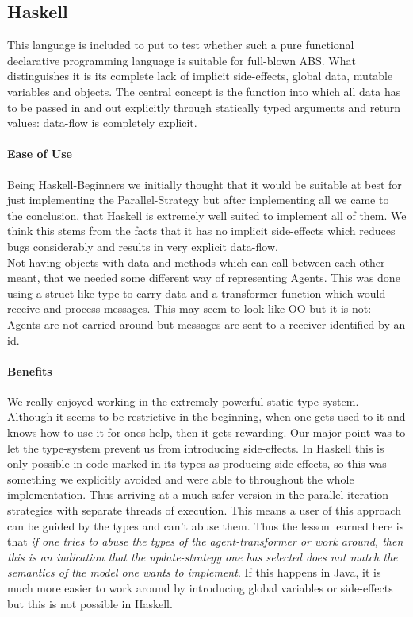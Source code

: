  
\subsection{Haskell}
This language is included to put to test whether such a pure functional declarative programming language is suitable for full-blown ABS. What distinguishes it is its complete lack of implicit side-effects, global data, mutable variables and objects. The central concept is the function into which all data has to be passed in and out explicitly through statically typed arguments and return values: data-flow is completely explicit.

\paragraph{Ease of Use}
Being Haskell-Beginners we initially thought that it would be suitable at best for just implementing the Parallel-Strategy but after implementing all we came to the conclusion, that Haskell is extremely well suited to implement all of them. We think this stems from the facts that it has no implicit side-effects which reduces bugs considerably and results in very explicit data-flow. \\

Not having objects with data and methods which can call between each other meant, that we needed some different way of representing Agents. This was done using a struct-like type to carry data and a transformer function which would receive and process messages. This may seem to look like OO but it is not: Agents are not carried around but messages are sent to a receiver identified by an id.

\paragraph{Benefits}
We really enjoyed working in the extremely powerful static type-system. Although it seems to be restrictive in the beginning, when one gets used to it and knows how to use it for ones help, then it gets rewarding. Our major point was to let the type-system prevent us from introducing side-effects. In Haskell this is only possible in code marked in its types as producing side-effects, so this was something we explicitly avoided and were able to throughout the whole implementation. Thus arriving at a much safer version in the parallel iteration-strategies with separate threads of execution. This means a user of this approach can be guided by the types and can't abuse them. Thus the lesson learned here is that \textit{if one tries to abuse the types of the agent-transformer or work around, then this is an indication that the update-strategy one has selected does not match the semantics of the model one wants to implement}. If this happens in Java, it is much more easier to work around by introducing global variables or side-effects but this is not possible in Haskell. \\

